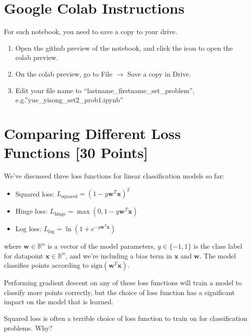 \documentclass{article}
\begin{document}
\section*{Google Colab Instructions}
For each notebook, you need to save a copy to your drive.
\begin{enumerate}
	\item Open the github preview of the notebook, and click the icon to open the colab preview.
	\item On the colab preview, go to File $\rightarrow$ Save a copy in Drive.
	\item Edit your file name to “lastname_firstname_set_problem”, e.g.”yue_yisong_set2_prob1.ipynb”
\end{enumerate}



\newpage
\section{Comparing Different Loss Functions [30 Points]}

We've discussed three loss functions for linear classification models so far:
\begin{itemize}
\item Squared loss: $L_\text{squared} = (1 - y\mathbf{w}^T\mathbf{x})^2$
\item Hinge loss: $L_\text{hinge} = \max(0, 1 - y\mathbf{w}^T\mathbf{x})$
\item Log loss: $L_\text{log} = \ln(1 + e^{-y\mathbf{w}^T\mathbf{x}})$
\end{itemize}
where $\mathbf{w} \in \mathbb{R}^n$ is a vector of the model parameters, $y \in \{-1,1\}$ is the class label for datapoint $\mathbf{x} \in \mathbb{R}^n$, and we're including a bias term in $\mathbf{x}$ and $\mathbf{w}$.  The model classifies points according to $\text{sign}(\mathbf{w}^T\mathbf{x})$.

Performing gradient descent on any of these loss functions will train a model to classify more points correctly, but the choice of loss function has a significant impact on the model that is learned.

\problem[3]
Squared loss is often a terrible choice of loss function to train on for classification problems.  Why?

\begin{solution}

\end{solution}
\end{document}
